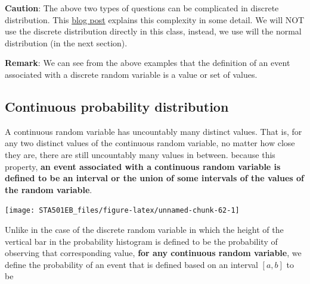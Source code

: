 \documentclass[
]{book}
\begin{document}
\textbf{Caution}: The above two types of questions can be complicated in discrete distribution. This \href{https://valelab4.ucsf.edu/svn/3rdpartypublic/boost/libs/math/doc/sf_and_dist/html/math_toolkit/policy/pol_tutorial/understand_dis_quant.html}{blog post} explains this complexity in some detail. We will NOT use the discrete distribution directly in this class, instead, we use will the normal distribution (in the next section).

\textbf{Remark}: We can see from the above examples that the definition of an event associated with a discrete random variable is a value or set of values.

\hypertarget{continuous-probability-distribution}{%
\subsection{Continuous probability distribution}\label{continuous-probability-distribution}}

A continuous random variable has uncountably many distinct values. That is, for any two distinct values of the continuous random variable, no matter how close they are, there are still uncountably many values in between. because this property, \textbf{an event associated with a continuous random variable is defined to be an interval or the union of some intervals of the values of the random variable}.

\begin{center}\texttt{[image: STA501EB\_files/figure-latex/unnamed-chunk-62-1]} \end{center}

Unlike in the case of the discrete random variable in which the height of the vertical bar in the probability histogram is defined to be the probability of observing that corresponding value, \textbf{for any continuous random variable}, we define the probability of an event that is defined based on an interval \([a, b]\) to be
\end{document}

